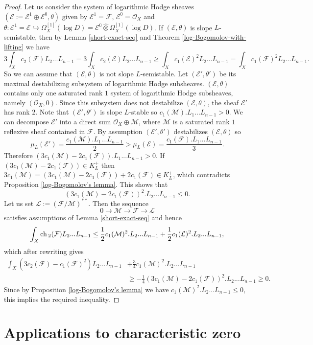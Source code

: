 \documentclass[12pt]{article}
\theoremstyle{plain}
\theoremstyle{definition}
\theoremstyle{remark}
\newcommand{\cE}{{\mathcal E}}
\newcommand{\cF}{{\mathcal F}}
\newcommand{\cL}{{\mathcal L}}
\newcommand{\cM}{{\mathcal M}}
\newcommand{\cO}{{\mathcal O}}
\newcommand{\ch}{{\mathop{\rm ch \, }}}
\begin{document}
\begin{proof}
	Let us consider the system of logarithmic Hodge sheaves $(\cE:=\cE^1\oplus \cE^0, \theta )$ given
	by $\cE^1=\cF$, $\cE^0=\cO _X$ and $\theta : \cE^1=\cE \hookrightarrow  \Omega_X^{[1]}(\log D)=\cE^0\hat \otimes  \Omega_X^{[1]}(\log D)$.
	If $(\cE, \theta)$ is slope $L$-semistable, then by Lemma \ref{short-exact-seq} and
	Theorem \ref{log-Bogomolov-with-lifting} we have
	$$
	 3\int_Xc_2(\cF)L_2...L_{n-1}= 3\int_Xc_2(\cE)L_2...L_{n-1}\ge \int_Xc_1(\cE)^2 L_2...L_{n-1}= \int_Xc_1(\cF)^2 L_2...L_{n-1}.$$
	So we can assume that $(\cE, \theta)$ is not slope $L$-semistable. Let
	$(\cE', \theta ')$ be its maximal destabilizing subsystem of logarithmic Hodge subsheaves.
	$(\cE, \theta)$ contains only one saturated rank $1$ system of logarithmic Hodge subsheaves,
	namely $(\cO _X, 0)$. Since this subsystem   does not destabilize $(\cE, \theta)$, the sheaf
	$\cE'$ has rank $2$. Note that $(\cE', \theta ')$ is slope $L$-stable so $c_1(\cM) .L_1...L_{n-1}>0$.
		We can decompose  $\cE'$ into a direct sum $\cO _X\oplus \cM$, where $\cM$ is a saturated
	rank $1$ reflexive sheaf contained in $\cF$. By assumption $(\cE',\theta')$ destabilizes $(\cE, \theta)$ so
	$$\mu _L(\cE')=\frac{c_1(\cM). L_1...L_{n-1}}{2}> \mu _ L(\cE)=\frac{c_1(\cF). L_1...L_{n-1}}{3}.$$
	Therefore $(3c_1(\cM)-2c_1(\cF)).L_1...L_{n-1}>0$. If $(3c_1(\cM)-2c_1(\cF))\in K_L^{+}$ then
	$3c_1(\cM)=(3c_1(\cM)-2c_1(\cF))+2c_1(\cF)\in K_L^{+}$, which contradicts Proposition
	\ref{log-Bogomolov's lemma}. This shows that $$(3c_1(\cM)-2c_1(\cF))^2.L_2...L_{n-1}\le 0.$$
	Let us set $\cL:= (\cF/\cM)^{**}$. Then the sequence 
	$$0\to \cM \to \cF \to \cL$$
satisfies assumptions of Lemma \ref{short-exact-seq} and hence 
	$$\int _X \ch _2 (\cF)L_2...L_{n-1} \le \frac{1}{2} c_1(\cM)^2. L_2...L_{n-1}  +
	\frac{1}{2} c_1(\cL)^2. L_2...L_{n-1} ,$$
	which after rewriting gives
	\begin{align*}
		\int_X(3 c_2(\cF)-c_1(\cF)^2) L_2...L_{n-1}&+\frac{3}{4} c_1(\cM)^2. L_2...L_{n-1}\\
		&\ge -\frac{1}{4}(3c_1(\cM)-2c_1(\cF))^2.L_2...L_{n-1}\ge 0.	
	\end{align*}
Since by Proposition \ref{log-Bogomolov's lemma} we  have $ c_1(\cM)^2. L_2...L_{n-1}\le 0$, this implies the required inequality.
\end{proof}


\section{Applications to  characteristic zero} \label{Section:characteristic-0}
\end{document}
